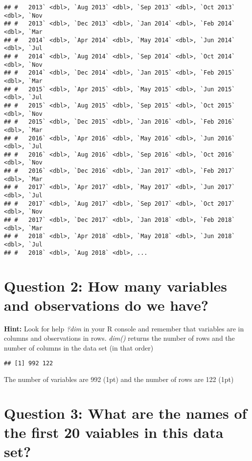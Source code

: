 \documentclass[
]{article}
\begin{document}
\begin{verbatim}
## #   2013` <dbl>, `Aug 2013` <dbl>, `Sep 2013` <dbl>, `Oct 2013` <dbl>, `Nov
## #   2013` <dbl>, `Dec 2013` <dbl>, `Jan 2014` <dbl>, `Feb 2014` <dbl>, `Mar
## #   2014` <dbl>, `Apr 2014` <dbl>, `May 2014` <dbl>, `Jun 2014` <dbl>, `Jul
## #   2014` <dbl>, `Aug 2014` <dbl>, `Sep 2014` <dbl>, `Oct 2014` <dbl>, `Nov
## #   2014` <dbl>, `Dec 2014` <dbl>, `Jan 2015` <dbl>, `Feb 2015` <dbl>, `Mar
## #   2015` <dbl>, `Apr 2015` <dbl>, `May 2015` <dbl>, `Jun 2015` <dbl>, `Jul
## #   2015` <dbl>, `Aug 2015` <dbl>, `Sep 2015` <dbl>, `Oct 2015` <dbl>, `Nov
## #   2015` <dbl>, `Dec 2015` <dbl>, `Jan 2016` <dbl>, `Feb 2016` <dbl>, `Mar
## #   2016` <dbl>, `Apr 2016` <dbl>, `May 2016` <dbl>, `Jun 2016` <dbl>, `Jul
## #   2016` <dbl>, `Aug 2016` <dbl>, `Sep 2016` <dbl>, `Oct 2016` <dbl>, `Nov
## #   2016` <dbl>, `Dec 2016` <dbl>, `Jan 2017` <dbl>, `Feb 2017` <dbl>, `Mar
## #   2017` <dbl>, `Apr 2017` <dbl>, `May 2017` <dbl>, `Jun 2017` <dbl>, `Jul
## #   2017` <dbl>, `Aug 2017` <dbl>, `Sep 2017` <dbl>, `Oct 2017` <dbl>, `Nov
## #   2017` <dbl>, `Dec 2017` <dbl>, `Jan 2018` <dbl>, `Feb 2018` <dbl>, `Mar
## #   2018` <dbl>, `Apr 2018` <dbl>, `May 2018` <dbl>, `Jun 2018` <dbl>, `Jul
## #   2018` <dbl>, `Aug 2018` <dbl>, ...
\end{verbatim}

\hypertarget{question-2-how-many-variables-and-observations-do-we-have}{%
\section{Question 2: How many variables and observations do we
have?}\label{question-2-how-many-variables-and-observations-do-we-have}}

\textbf{Hint:} Look for help \emph{?dim} in your R console and remember
that variables are in columns and observations in rows. \emph{dim()}
returns the number of rows and the number of columns in the data set (in
that order)

\begin{verbatim}
## [1] 992 122
\end{verbatim}

The number of variables are 992 (1pt) and the number of rows are 122
(1pt)

\hypertarget{question-3-what-are-the-names-of-the-first-20-vaiables-in-this-data-set}{%
\section{Question 3: What are the names of the first 20 vaiables in this
data
set?}\label{question-3-what-are-the-names-of-the-first-20-vaiables-in-this-data-set}}
\end{document}
